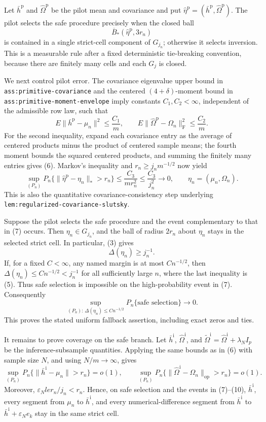 Let \(\bar h^{\mathrm p}\) and \(\widehat\Omega^{\mathrm p}\) be the pilot mean and covariance and put \(\widehat\eta^{\mathrm p}=(\bar h^{\mathrm p},\widehat\Omega^{\mathrm p})\).  The pilot selects the safe procedure precisely when the closed ball
\[
 \overline B_*(\widehat\eta^{\mathrm p},3r_n)
\]
is contained in a single strict-cell component of \(G_{j_n}\); otherwise it selects inversion.  This is a measurable rule after a fixed deterministic tie-breaking convention, because there are finitely many cells and each \(G_j\) is closed.

We next control pilot error.  The covariance eigenvalue upper bound in \texttt{ass:primitive-covariance} and the centered \((4+\delta)\)-moment bound in \texttt{ass:primitive-moment-envelope} imply constants \(C_1,C_2<\infty\), independent of the admissible row law, such that
\[
 E\|\bar h^{\mathrm p}-\mu_n\|^2\le \frac{C_1}{m},
 \qquad
 E\|\widehat\Omega^{\mathrm p}-\Omega_n\|_{\mathrm F}^2\le \frac{C_2}{m}. \tag{6}
\]
For the second inequality, expand each covariance entry as the average of centered products minus the product of centered sample means; the fourth moment bounds the squared centered products, and summing the finitely many entries gives (6).  Markov's inequality and \(r_n\ge j_nm^{-1/2}\) now yield
\[
 \sup_{(P_n)}P_n\{\|\widehat\eta^{\mathrm p}-\eta_n\|_*>r_n\}
 \le \frac{C_3}{m r_n^2}
 \le \frac{C_3}{j_n^2}\longrightarrow0,
 \qquad \eta_n=(\mu_n,\Omega_n). \tag{7}
\]
This is also the quantitative covariance-consistency step underlying \texttt{lem:regularized-covariance-slutsky}.

Suppose the pilot selects the safe procedure and the event complementary to that in (7) occurs.  Then \(\eta_n\in G_{j_n}\), and the ball of radius \(2r_n\) about \(\eta_n\) stays in the selected strict cell.  In particular, (3) gives
\[
 \Delta(\eta_n)\ge j_n^{-1}. \tag{8}
\]
If, for a fixed \(C<\infty\), any named margin is at most \(Cn^{-1/2}\), then \(\Delta(\eta_n)\le Cn^{-1/2}<j_n^{-1}\) for all sufficiently large \(n\), where the last inequality is (5).  Thus safe selection is impossible on the high-probability event in (7).  Consequently
\[
 \sup_{(P_n):\,\Delta(\eta_n)\le Cn^{-1/2}}
 P_n\{\text{safe selection}\}\longrightarrow0. \tag{9}
\]
This proves the stated uniform fallback assertion, including exact zeros and ties.

It remains to prove coverage on the safe branch.  Let \(\bar h^{\mathrm i}\), \(\widehat\Omega^{\mathrm i}\), and \(\widetilde\Omega^{\mathrm i}=\widehat\Omega^{\mathrm i}+\lambda_NI_p\) be the inference-subsample quantities.  Applying the same bounds as in (6) with sample size \(N\), and using \(N/m\to\infty\), gives
\[
 \sup_{(P_n)}P_n\{\|\bar h^{\mathrm i}-\mu_n\|>r_n\}=o(1),
 \qquad
 \sup_{(P_n)}P_n\{\|\widehat\Omega^{\mathrm i}-\Omega_n\|_{\mathrm{op}}>r_n\}=o(1). \tag{10}
\]
Moreover, \(\varepsilon_Nle r_n/j_n<r_n\).  Hence, on safe selection and the events in (7)--(10), \(\bar h^{\mathrm i}\), every segment from \(\mu_n\) to \(\bar h^{\mathrm i}\), and every numerical-difference segment from \(\bar h^{\mathrm i}\) to \(\bar h^{\mathrm i}+\varepsilon_Ne_k\) stay in the same strict cell.


